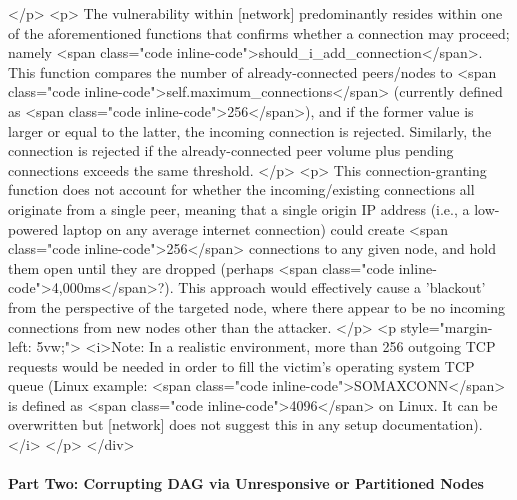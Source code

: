 \begin{rawhtml}
            </p>
            <p>
	           	The vulnerability within [network] predominantly resides within one of the aforementioned functions that confirms whether a connection may proceed; namely <span class="code inline-code">should_i_add_connection</span>. This function compares the number of already-connected peers/nodes to <span class="code inline-code">self.maximum_connections</span> (currently defined as <span class="code inline-code">256</span>), and if the former value is larger or equal to the latter, the incoming connection is rejected. Similarly, the connection is rejected if the already-connected peer volume plus pending connections exceeds the same threshold.
            </p>
            <p>
            	This connection-granting function does not account for whether the incoming/existing connections all originate from a single peer, meaning that a single origin IP address (i.e., a low-powered laptop on any average internet connection) could create <span class="code inline-code">256</span> connections to any given node, and hold them open until they are dropped (perhaps <span class="code inline-code">4,000ms</span>?). This approach would effectively cause a 'blackout' from the perspective of the targeted node, where there appear to be no incoming connections from new nodes other than the attacker.
            </p>
            <p style="margin-left: 5vw;">
            	<i>Note: In a realistic environment, more than 256 outgoing TCP requests would be needed in order to fill the victim's operating system TCP queue (Linux example: <span class="code inline-code">SOMAXCONN</span> is defined as <span class="code inline-code">4096</span> on Linux. It can be overwritten but [network] does not suggest this in any setup documentation).</i>
            </p>
        </div>
\end{rawhtml}

\paragraph{Part Two: Corrupting DAG via Unresponsive or Partitioned Nodes}

